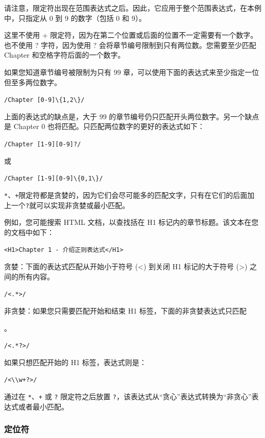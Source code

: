 \documentclass[doctor,openright,twoside]{sjtuthesis}
\newcommand{\passthrough}[1]{#1}
\theoremstyle{plain}
\theoremstyle{definition}
\theoremstyle{remark}
\theoremstyle{ocrenumbox}
\theoremstyle{plain}
\begin{document}
请注意，限定符出现在范围表达式之后。因此，它应用于整个范围表达式，在本例中，只指定从 0 到 9 的数字（包括 0 和 9）。

这里不使用 + 限定符，因为在第二个位置或后面的位置不一定需要有一个数字。也不使用 ? 字符，因为使用 ? 会将章节编号限制到只有两位数。您需要至少匹配 Chapter 和空格字符后面的一个数字。

如果您知道章节编号被限制为只有 99 章，可以使用下面的表达式来至少指定一位但至多两位数字。

\passthrough{\lstinline!/Chapter [0-9]\{1,2\}/!}

上面的表达式的缺点是，大于 99 的章节编号仍只匹配开头两位数字。另一个缺点是 Chapter 0 也将匹配。只匹配两位数字的更好的表达式如下：

\passthrough{\lstinline!/Chapter [1-9][0-9]?/!}

或

\passthrough{\lstinline!/Chapter [1-9][0-9]\{0,1\}/!}

\passthrough{\lstinline!*!}、\passthrough{\lstinline!+!}限定符都是贪婪的，因为它们会尽可能多的匹配文字，只有在它们的后面加上一个\passthrough{\lstinline!?!}就可以实现非贪婪或最小匹配。

例如，您可能搜索 HTML 文档，以查找括在 H1 标记内的章节标题。该文本在您的文档中如下：

\passthrough{\lstinline!<H1>Chapter 1 - 介绍正则表达式</H1>!}

贪婪：下面的表达式匹配从开始小于符号 (\textless) 到关闭 H1 标记的大于符号 (\textgreater) 之间的所有内容。

\passthrough{\lstinline!/<.*>/!}

非贪婪：如果您只需要匹配开始和结束 H1 标签，下面的非贪婪表达式只匹配

。

\passthrough{\lstinline!/<.*?>/!}

如果只想匹配开始的 H1 标签，表达式则是：

\passthrough{\lstinline!/<\\w+?>/!}

通过在 \passthrough{\lstinline!*!}、\passthrough{\lstinline!+!} 或 \passthrough{\lstinline!?!} 限定符之后放置 \passthrough{\lstinline!?!}，该表达式从``贪心''表达式转换为``非贪心''表达式或者最小匹配。

\hypertarget{section-89}{%
\subsubsection{定位符}\label{section-89}}
\end{document}
